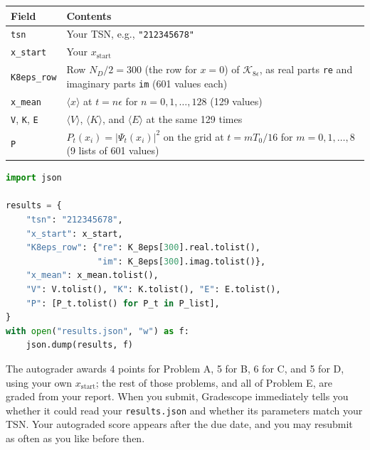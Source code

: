 \begin{center}
  \begin{tabular}{@{}lp{}@{}}
    \toprule
    Field                              & Contents                                                                                                                                         \\
    \midrule
    \texttt{tsn}                       & Your TSN, e.g., \texttt{"212345678"}                                                                                                             \\
    \texttt{x\_start}                  & Your $x_\mathrm{start}$                                                                                                                          \\
    \texttt{K8eps\_row}                & Row $N_D/2 = 300$ (the row for $x = 0$) of $\mathcal K_{8\epsilon}$, as real parts \texttt{re} and imaginary parts \texttt{im} (601 values each) \\
    \texttt{x\_mean}                   & $\langle x\rangle$ at $t = n\epsilon$ for $n = 0, 1, \ldots, 128$ (129 values)                                                                   \\
    \texttt{V}, \texttt{K}, \texttt{E} & $\langle V\rangle$, $\langle K\rangle$, and $\langle E\rangle$ at the same 129 times                                                             \\
    \texttt{P}                         & $P_t(x_i) = |\Psi_t(x_i)|^2$ on the grid at $t = mT_0/16$ for $m = 0, 1, \ldots, 8$ (9 lists of 601 values)                                      \\
    \bottomrule
  \end{tabular}
\end{center}

\begin{lstlisting}[language=Python]
import json

results = {
    "tsn": "212345678",
    "x_start": x_start,
    "K8eps_row": {"re": K_8eps[300].real.tolist(),
                  "im": K_8eps[300].imag.tolist()},
    "x_mean": x_mean.tolist(),
    "V": V.tolist(), "K": K.tolist(), "E": E.tolist(),
    "P": [P_t.tolist() for P_t in P_list],
}
with open("results.json", "w") as f:
    json.dump(results, f)
\end{lstlisting}

The autograder awards 4 points for Problem A, 5 for B, 6 for C, and 5 for D, using your own $x_\mathrm{start}$; the rest of those problems, and all of Problem E, are graded from your report.
When you submit, Gradescope immediately tells you whether it could read your \texttt{results.json} and whether its parameters match your TSN.
Your autograded score appears after the due date, and you may resubmit as often as you like before then.


